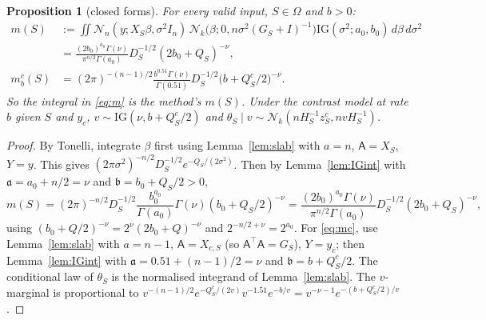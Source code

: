 \documentclass[11pt]{article}
\newtheorem{proposition}[theorem]{Proposition}
\theoremstyle{remark}
\newcommand{\IG}{\mathrm{IG}}
\newcommand{\N}{\mathcal N}
\newcommand{\tr}{^{\top}}
\newcommand{\Om}{\Omega}
\newcommand{\yc}{y_c}
\begin{document}
\begin{proposition}[closed forms]\label{prop:closed}
For every valid input, $S\in\Om$ and $b>0$:
\begin{align}
m(S)&:=\iint\N_n(y;X_S\beta,\sigma^2I_n)\,\N_k\big(\beta;0,n\sigma^2(G_S+I)^{-1}\big)\IG(\sigma^2;a_0,b_0)\,d\beta\,d\sigma^2\nonumber\\
&=\frac{(2b_0)^{a_0}\Gamma(\nu)}{\pi^{n/2}\Gamma(a_0)}D_S^{-1/2}(2b_0+Q_S)^{-\nu},\label{eq:m}\\
m^c_b(S)&=(2\pi)^{-(n-1)/2}\frac{b^{0.51}\Gamma(\nu)}{\Gamma(0.51)}D_S^{-1/2}\big(b+Q^c_S/2\big)^{-\nu}.\label{eq:mc}
\end{align}
So the integral in \eqref{eq:m} is the method's $m(S)$. Under the contrast model at rate $b$ given $S$ and $\yc$, $v\sim\IG(\nu,b+Q^c_S/2)$ and $\theta_S\mid v\sim\N_k(nH_S^{-1}z^c_S,nvH_S^{-1})$.
\end{proposition}
\begin{proof}
By Tonelli, integrate $\beta$ first using Lemma~\ref{lem:slab} with $a=n$, $\mathsf{A}=X_S$, $Y=y$. This gives $(2\pi\sigma^2)^{-n/2}D_S^{-1/2}e^{-Q_S/(2\sigma^2)}$. Then by Lemma~\ref{lem:IGint} with $\mathfrak a=a_0+n/2=\nu$ and $\mathfrak b=b_0+Q_S/2>0$,
\[
m(S)=(2\pi)^{-n/2}D_S^{-1/2}\frac{b_0^{a_0}}{\Gamma(a_0)}\Gamma(\nu)(b_0+Q_S/2)^{-\nu}
=\frac{(2b_0)^{a_0}\Gamma(\nu)}{\pi^{n/2}\Gamma(a_0)}D_S^{-1/2}(2b_0+Q_S)^{-\nu},
\]
using $(b_0+Q/2)^{-\nu}=2^\nu(2b_0+Q)^{-\nu}$ and $2^{-n/2+\nu}=2^{a_0}$. For \eqref{eq:mc}, use Lemma~\ref{lem:slab} with $a=n-1$, $\mathsf{A}=X_{c,S}$ (so $\mathsf{A}\tr\mathsf{A}=G_S$), $Y=\yc$; then Lemma~\ref{lem:IGint} with $\mathfrak a=0.51+(n-1)/2=\nu$ and $\mathfrak b=b+Q^c_S/2$. The conditional law of $\theta_S$ is the normalised integrand of Lemma~\ref{lem:slab}. The $v$-marginal is proportional to $v^{-(n-1)/2}e^{-Q^c_S/(2v)}v^{-1.51}e^{-b/v}=v^{-\nu-1}e^{-(b+Q^c_S/2)/v}$.
\end{proof}
\end{document}
